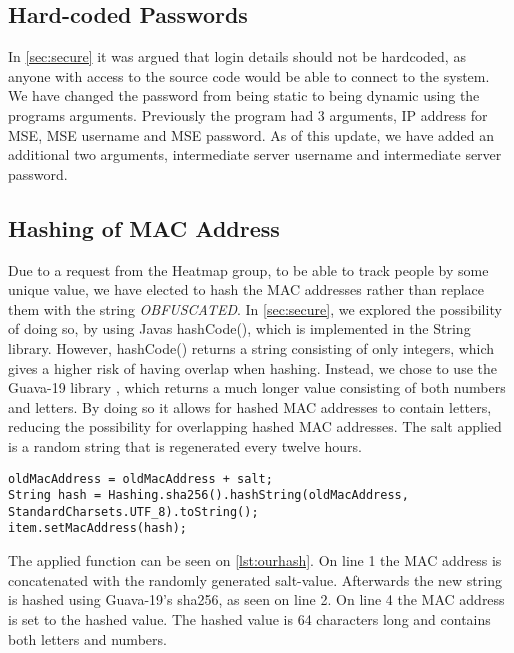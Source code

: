 \subsection*{Hard-coded Passwords}
In \cref{sec:secure} it was argued that login details should not be hardcoded, as anyone with access to the source code would be able to connect to the system. We have changed the password from being static to being dynamic using the programs arguments. Previously the program had 3 arguments, IP address for MSE, MSE username and MSE password. As of this update, we have added an additional two arguments, intermediate server username and intermediate server password.

\subsection*{Hashing of MAC Address}
Due to a request from the Heatmap group, to be able to track people by some unique value, we have elected to hash the MAC addresses rather than replace them with the string \emph{OBFUSCATED}. In \cref{sec:secure}, we explored the possibility of doing so, by using Javas hashCode(), which is implemented in the String library. However, hashCode() returns a string consisting of only integers, which gives a higher risk of having overlap when hashing. Instead, we chose to use the Guava-19 library \cite{Guava}, which returns a much longer value consisting of both numbers and letters. By doing so it allows for hashed MAC addresses to contain letters, reducing the possibility for overlapping hashed MAC addresses. The salt applied is a random string that is regenerated every twelve hours. 

\begin{lstlisting}[caption={Hashing a MAC address},label={lst:ourhash},language=inc_Java]
oldMacAddress = oldMacAddress + salt;
String hash = Hashing.sha256().hashString(oldMacAddress, 
StandardCharsets.UTF_8).toString();
item.setMacAddress(hash);
\end{lstlisting}

The applied function can be seen on \cref{lst:ourhash}. On line 1 the MAC address is concatenated with the randomly generated salt-value. Afterwards the new string is hashed using Guava-19's sha256, as seen on line 2. On line 4 the MAC address is set to the hashed value. The hashed value is 64 characters long and contains both letters and numbers.